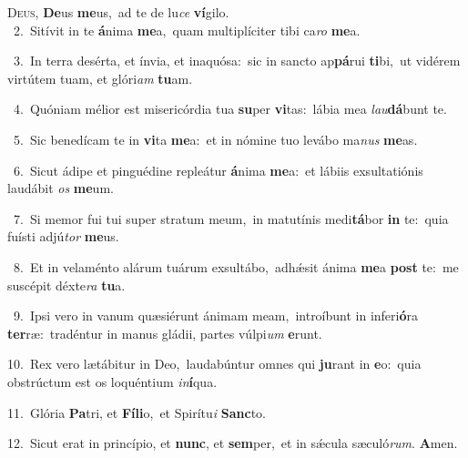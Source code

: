 \lettrine{\initial\textcolor{\initialcolor}{D}}{eus,} \textbf{De}\-us \textbf{me}\-us,~\star ad te de lu\textit{ce} \textbf{ví}\-gilo.\\
{\numbfont\textcolor{\numbcolor}{~2.}}~Sitívit in te \textbf{á}\-nima \textbf{me}\-a,~\star quam multiplíciter tibi ca\textit{ro} \textbf{me}\-a.\par
{\numbfont\textcolor{\numbcolor}{~3.}}~In terra desérta, et ínvia, et inaquósa:~\dagger sic in sancto ap\-\textbf{pá}\-rui \textbf{ti}\-bi,~\star ut vidérem virtútem tuam, et glóri\textit{am} \textbf{tu}\-am.\par
{\numbfont\textcolor{\numbcolor}{~4.}}~Quóniam mélior est misericórdia tua \textbf{su}\-per \textbf{vi}\-tas:~\star lábia mea \textit{lau}\-\textbf{dá}bunt te.\par
{\numbfont\textcolor{\numbcolor}{~5.}}~Sic benedícam te in \textbf{vi}\-ta \textbf{me}\-a:~\star et in nómine tuo levábo ma\textit{nus} \textbf{me}\-as.\par
{\numbfont\textcolor{\numbcolor}{~6.}}~Sicut ádipe et pinguédine repleátur \textbf{á}\-nima \textbf{me}\-a:~\star et lábiis exsultatiónis laudábit \textit{os} \textbf{me}\-um.\par
{\numbfont\textcolor{\numbcolor}{~7.}}~Si memor fui tui super stratum meum,~\dagger in matutínis medi\-\textbf{tá}\-bor \textbf{in} te:~\star quia fuísti adjú\textit{tor} \textbf{me}\-us.\par
{\numbfont\textcolor{\numbcolor}{~8.}}~Et in velaménto alárum tuárum exsultábo,~\dagger adhǽsit ánima \textbf{me}\-a \textbf{post} te:~\star me suscépit déxte\textit{ra} \textbf{tu}\-a.\par
{\numbfont\textcolor{\numbcolor}{~9.}}~Ipsi vero in vanum quæsiérunt ánimam meam,~\dagger introíbunt in inferi\-\textbf{ó}\-ra \textbf{ter}\-ræ:~\star tradéntur in manus gládii, partes vúlpi\textit{um} \textbf{e}\-runt.\par
{\numbfont\textcolor{\numbcolor}{10.}}~Rex vero lætábitur in Deo,~\dagger laudabúntur omnes qui \textbf{ju}\-rant in \textbf{e}\-o:~\star quia obstrúctum est os loquéntium \textit{in}\-\textbf{í}qua.\par
{\numbfont\textcolor{\numbcolor}{11.}}~Glória \textbf{Pa}\-tri, et \textbf{Fí}\-\textbf{li}o,~\star et Spirítu\textit{i} \textbf{Sanc}\-to.\par
{\numbfont\textcolor{\numbcolor}{12.}}~Sicut erat in princípio, et \textbf{nunc}\-, et \textbf{sem}\-per,~\star et in sǽcula sæculó\-\textit{rum}\-. \textbf{A}\-men.\par
